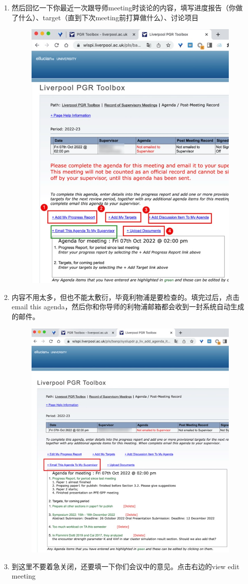 \begin{enumerate}
\begin{figure}[H]
    \end{figure}
    \item 然后回忆一下你最近一次跟导师meeting时谈论的内容，填写进度报告（你做了什么）、target（直到下次meeting前打算做什么）、讨论项目
    \begin{figure}[H]
        \centering
        \includegraphics[width=0.5\columnwidth]{author-folder/Kai.Wu/meeting_record_figures/add_items_to_meetings.jpg}
    \end{figure}
    \item 内容不用太多，但也不能太敷衍，毕竟利物浦是要检查的。填完过后，点击email this agenda，然后你和你导师的利物浦邮箱都会收到一封系统自动生成的邮件。
    \begin{figure}[H]
        \centering
        \includegraphics[width=0.5\columnwidth]{author-folder/Kai.Wu/meeting_record_figures/email_to.jpg}
    \end{figure}
    \item 到这里不要着急关闭，还要填一下你们会议中的意见。点击右边的view edit meeting
    \begin{figure}[H]

\end{figure}
\end{enumerate}
